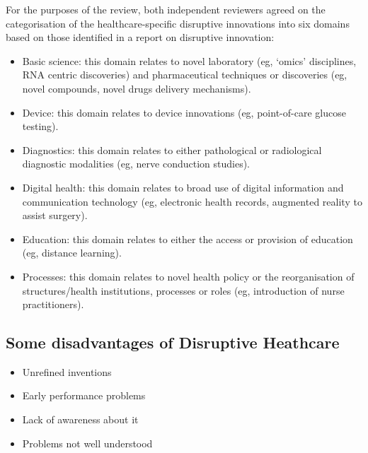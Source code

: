 \documentclass[12pts]{article}
\begin{document}
\begin{large}
For the purposes of the review, both independent reviewers agreed on the categorisation of the healthcare-specific disruptive innovations into six domains based on those identified in a report on disruptive innovation:

\begin{itemize}


\item Basic science: this domain relates to novel laboratory (eg, ‘omics’ disciplines, RNA centric discoveries) and pharmaceutical techniques or discoveries (eg, novel compounds, novel drugs delivery mechanisms).

\item Device: this domain relates to device innovations (eg, point-of-care glucose testing).

\item  Diagnostics: this domain relates to either pathological or radiological diagnostic modalities (eg, nerve conduction studies).

\item Digital health: this domain relates to broad use of digital information and communication technology (eg, electronic health records, augmented reality to assist surgery).

\item Education: this domain relates to either the access or provision of education (eg, distance learning).

\item Processes: this domain relates to novel health policy or the reorganisation of structures/health institutions, processes or roles (eg, introduction of nurse practitioners).
\end{itemize}
\subsection*{Some disadvantages of Disruptive Heathcare}
\begin{itemize}
\item Unrefined inventions
\item Early performance problems
\item Lack of awareness about it
\item Problems not well understood
\end{itemize}

\end{large}
\end{document}
